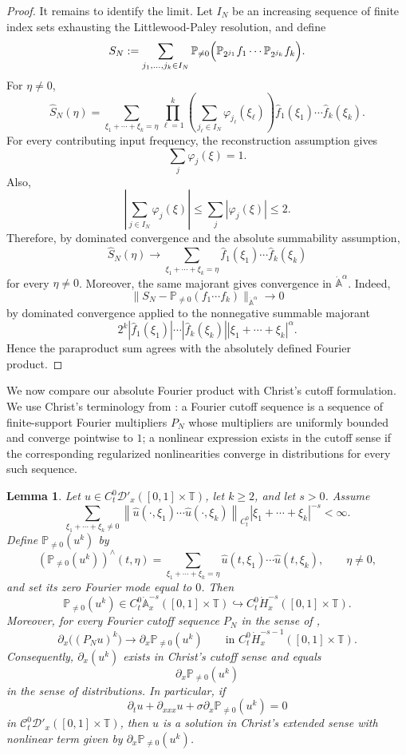 \documentclass[12pt,reqno,letterpaper]{amsart}
\numberwithin{equation}{section}
\newcommand{\1}{{\bf 1}}
\newcommand{\2}{{\bf 2}}
\newcommand{\A}{\mathbb A}
\newcommand{\T}{\mathbb T}
\newtheorem{lemma}[theorem]{Lemma}
\theoremstyle{remark}
\theoremstyle{remark}
\begin{document}
\begin{proof}
It remains to identify the limit. Let $I_N$ be an increasing sequence of
finite index sets exhausting the Littlewood-Paley resolution, and define
\[
S_N
:=
\sum_{j_1,\ldots,j_k\in I_N}
\mathbb P_{\neq0}\Bigl(\mathbb P_{2^{j_1}}f_1\cdots \mathbb P_{2^{j_k}}f_k\Bigr).
\]
For $\eta\neq0$,
\[
\hat{S}_N(\eta)
=
\sum_{\xi_1+\cdots+\xi_k=\eta}
\prod_{\ell=1}^k
\left(\sum_{j_\ell\in I_N}\varphi_{j_\ell}(\xi_\ell)\right)
\hat{f}_1(\xi_1)\cdots\hat{f}_k(\xi_k).
\]
For every contributing input frequency, the reconstruction assumption gives
\[
\sum_j \varphi_j(\xi)=1.
\]
Also,
\[
\left|\sum_{j\in I_N}\varphi_j(\xi)\right|
\le
\sum_j |\varphi_j(\xi)|
\le 2.
\]
Therefore, by dominated convergence and the absolute summability assumption,
\[
\hat{S}_N(\eta)\to
\sum_{\xi_1+\cdots+\xi_k=\eta}
\hat{f}_1(\xi_1)\cdots\hat{f}_k(\xi_k)
\]
for every $\eta\neq0$. Moreover, the same majorant gives convergence in
$\dot{\mathbb{A}}^\alpha$. Indeed,
\[
\|S_N-\mathbb P_{\neq0}(f_1\cdots f_k)\|_{\dot{\mathbb{A}}^\alpha}\to0
\]
by dominated convergence applied to the nonnegative summable majorant
\[
2^k
|\hat{f}_1(\xi_1)|\cdots|\hat{f}_k(\xi_k)|
|\xi_1+\cdots+\xi_k|^\alpha.
\]
Hence the paraproduct sum agrees with the absolutely defined Fourier product.
\end{proof}
We now compare our absolute Fourier product with Christ's cutoff formulation. We use Christ's terminology from \cite[Definitions~2.1-2.3]{Christ1}: a Fourier cutoff sequence is a sequence of finite-support Fourier multipliers $P_N$ whose multipliers are uniformly bounded and converge pointwise to $1$; a nonlinear expression exists in the cutoff sense if the corresponding regularized nonlinearities converge in distributions for every such sequence.

\begin{lemma}\label{lem:absolute-implies-christ-cutoff}
    Let $u\in C_t^0\mathcal D'_x([0,1] \times \T)$, let $k\ge2$, and let $s>0$. Assume
    \[
    \sum_{\xi_1+\cdots+\xi_k\neq 0} \left\|\hat u(\cdot,\xi_1)\cdots\hat u(\cdot,\xi_k)\right\|_{C_t^0}|\xi_1+\cdots+\xi_k|^{-s}<\infty.
    \]
    Define $\mathbb P_{\neq0}(u^k)$ by
    \[
    \left(\mathbb P_{\neq0}(u^k)\right)^{\wedge}(t,\eta) = \sum_{\xi_1+\cdots+\xi_k=\eta} \hat u(t,\xi_1)\cdots \hat u(t,\xi_k), \qquad \eta\neq 0,
    \]
    and set its zero Fourier mode equal to $0$. Then
    \[
    \mathbb P_{\neq0}(u^k) \in C_t^0\dot{\A}^{-s}_x([0,1] \times \T) \hookrightarrow C_t^0\dot H^{-s}_x([0,1] \times \T).
    \]
    Moreover, for every Fourier cutoff sequence $P_N$ in the sense of \cite[Definition~2.1]{Christ1},
    \[
    \partial_x \bigl((P_Nu)^k\bigr)\longrightarrow\partial_x\mathbb P_{\neq0}(u^k) \qquad \text{in } C_t^0\dot H^{-s-1}_x([0,1] \times \T).
    \]
    Consequently, $\partial_x(u^k)$ exists in Christ's cutoff sense and equals
    \[
    \partial_x\mathbb P_{\neq0}(u^k)
    \]
    in the sense of distributions. In particular, if
    \[
    \partial_t u+ \partial_{xxx}u+\sigma\partial_x\mathbb P_{\neq0}(u^k)=0
    \]
    in $\mathcal C_t^0 \mathcal{D}'_x([0,1]\times\T)$, then $u$ is a solution in Christ's extended sense with nonlinear term given by $\partial_x \mathbb P_{\neq0}(u^k)$.
\end{lemma}
\end{document}
